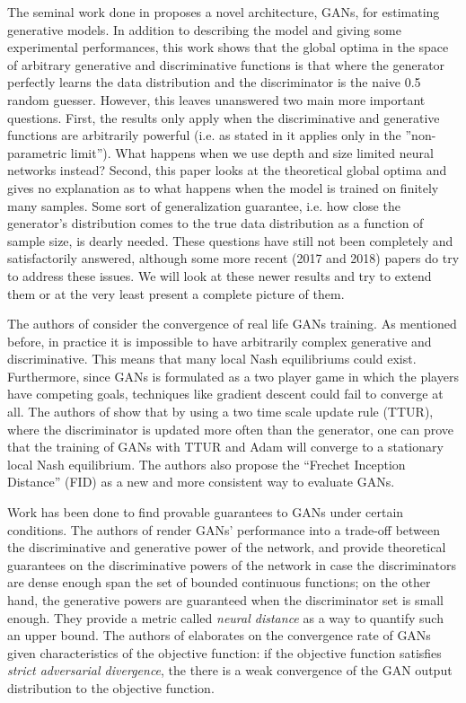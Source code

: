 \documentclass[11pt]{hw-template}
\begin{document}
\maketitle

The seminal work done in \cite{NIPS2014_5423} proposes a novel architecture, GANs, for estimating generative models. In addition to describing the model and giving some experimental performances, 
this work shows that the global optima in the space of arbitrary generative and discriminative functions is that where the generator perfectly learns the data distribution and the discriminator is 
the naive 0.5 random guesser. However, this leaves unanswered two main more important questions. First, the results only apply when the discriminative and generative functions are arbitrarily powerful 
(i.e. as stated in \cite{NIPS2014_5423} it applies only in the ''non-parametric limit''). What happens when we use depth and size limited neural networks instead? Second, this paper looks at the 
theoretical global optima and gives no explanation as to what happens when the model is trained on finitely many samples. Some sort of generalization guarantee, i.e. how close the generator's distribution 
comes to the true data distribution as a function of sample size, is dearly needed. These questions have still not been completely and satisfactorily answered, although some more recent (2017 and 2018) papers
do try to address these issues. We will look at these newer results and try to extend them or at the very least present a complete picture of them.

The authors of \cite{NIPS2017_7240} consider the convergence of real life GANs training. As mentioned before, in practice it is impossible to have arbitrarily complex generative and discriminative. This means
that many local Nash equilibriums could exist. Furthermore, since GANs is formulated as a two player game in which the players have competing goals, techniques like gradient descent could fail to converge at all.
The authors of \cite{NIPS2017_7240} show that by using a two time scale update rule (TTUR), where the discriminator is updated more often than the generator, one can prove that the training of GANs 
with TTUR and Adam will converge to 
a stationary local Nash equilibrium. The authors also propose the ``Frechet Inception Distance'' (FID) as a new and more consistent way to evaluate GANs.

Work has been done to find provable guarantees to GANs under certain conditions. The authors of \cite{zhang2018on} render GANs' performance into a trade-off between the discriminative and generative power of the network, and provide theoretical guarantees on the discriminative powers of the network in case the discriminators are dense enough span the set of bounded continuous functions; on the other hand, the generative powers are guaranteed when the discriminator set is small enough. They provide a metric called \textit{neural distance} as a way to quantify such an upper bound. The authors of \cite{liu2017approximation} elaborates on the convergence rate of GANs given characteristics of the objective function: if the objective function satisfies \textit{strict adversarial divergence}, the there is a weak convergence of the GAN output distribution to the objective function.


 
\end{document}
